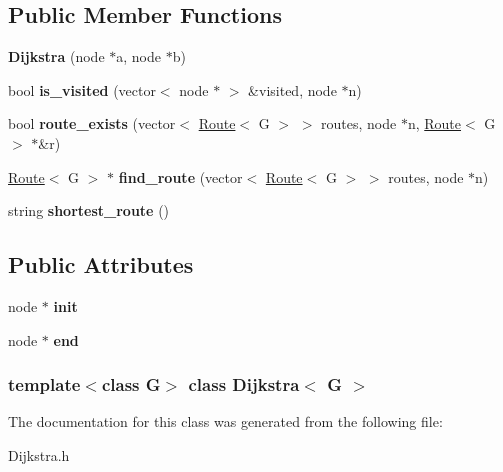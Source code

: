 \subsection*{\-Public \-Member \-Functions}
\begin{DoxyCompactItemize}
\item 
\hypertarget{classDijkstra_ad15665701dca1cce2abdf5db1b218d95}{{\bfseries \-Dijkstra} (node $\ast$a, node $\ast$b)}\label{classDijkstra_ad15665701dca1cce2abdf5db1b218d95}

\item 
\hypertarget{classDijkstra_a212a420156ac7776eb87035283f21755}{bool {\bfseries is\-\_\-visited} (vector$<$ node $\ast$ $>$ \&visited, node $\ast$n)}\label{classDijkstra_a212a420156ac7776eb87035283f21755}

\item 
\hypertarget{classDijkstra_aee316cf8360b24559f977ec02fdcfab7}{bool {\bfseries route\-\_\-exists} (vector$<$ \hyperlink{structRoute}{\-Route}$<$ \-G $>$ $>$ routes, node $\ast$n, \hyperlink{structRoute}{\-Route}$<$ \-G $>$ $\ast$\&r)}\label{classDijkstra_aee316cf8360b24559f977ec02fdcfab7}

\item 
\hypertarget{classDijkstra_ad2ac0f0bb8564853417dd098a5bc79a2}{\hyperlink{structRoute}{\-Route}$<$ \-G $>$ $\ast$ {\bfseries find\-\_\-route} (vector$<$ \hyperlink{structRoute}{\-Route}$<$ \-G $>$ $>$ routes, node $\ast$n)}\label{classDijkstra_ad2ac0f0bb8564853417dd098a5bc79a2}

\item 
\hypertarget{classDijkstra_af22b3c54f895c5fca46656fc2c624846}{string {\bfseries shortest\-\_\-route} ()}\label{classDijkstra_af22b3c54f895c5fca46656fc2c624846}

\end{DoxyCompactItemize}
\subsection*{\-Public \-Attributes}
\begin{DoxyCompactItemize}
\item 
\hypertarget{classDijkstra_ad11179ee15875eed583347e422489c2d}{node $\ast$ {\bfseries init}}\label{classDijkstra_ad11179ee15875eed583347e422489c2d}

\item 
\hypertarget{classDijkstra_a487ab8e38de740452df12f3f4583b097}{node $\ast$ {\bfseries end}}\label{classDijkstra_a487ab8e38de740452df12f3f4583b097}

\end{DoxyCompactItemize}
\subsubsection*{template$<$class G$>$ class Dijkstra$<$ G $>$}



\-The documentation for this class was generated from the following file\-:\begin{DoxyCompactItemize}
\item 
\-Dijkstra.\-h\end{DoxyCompactItemize}
